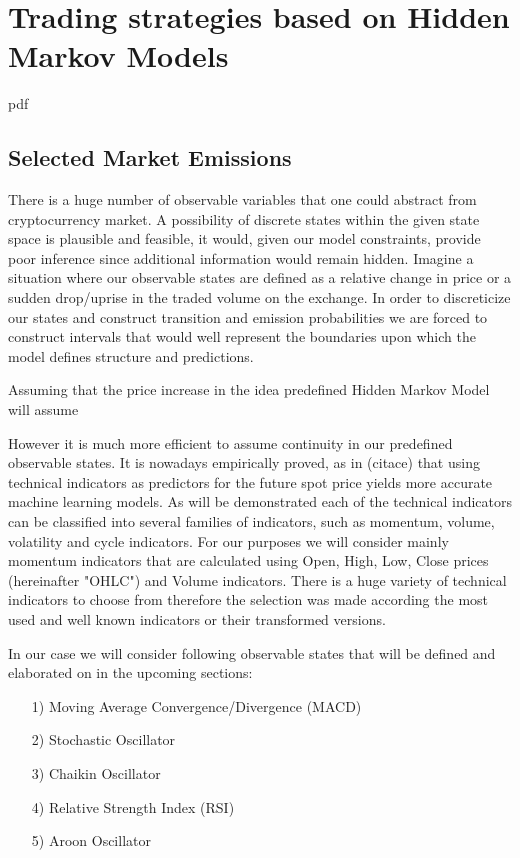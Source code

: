 \chapter{Trading strategies based on Hidden Markov Models}

\if
pdf
    \graphicspath{{Chapter5/Figs/Raster/}{Chapter5/Figs/PDF/}{Chapter5/Figs/}}
\else
    \graphicspath{{Chapter5/Figs/Vector/}{Chapter5/Figs/}}
\fi

\section{Selected Market Emissions}

	There is a huge number of observable variables that one could abstract from cryptocurrency market. A possibility of discrete states within the given state space is plausible and feasible, it would, given our model constraints, provide poor inference since additional information would remain hidden. Imagine a situation where our observable states are defined as a relative change in price or a sudden drop/uprise in the traded volume on the exchange. In order to discreticize our states and construct transition and emission probabilities we are forced to construct intervals that would well represent the boundaries upon which the model defines structure and predictions. 
	
Assuming that the price increase in   the idea predefined Hidden Markov Model will assume
	
	However it is much more efficient to assume continuity in our predefined observable states. It is nowadays empirically proved, as in (citace) that using technical indicators as predictors for the future spot price yields more accurate machine learning models. As will be demonstrated each of the technical indicators can be classified into several families of indicators, such as momentum, volume, volatility and cycle indicators. For our purposes we will consider mainly momentum indicators that are calculated using Open, High, Low, Close prices (hereinafter "OHLC") and Volume indicators. There is a huge variety of technical indicators to choose from therefore the selection was made according the most used and well known indicators or their transformed versions. 

In our case we will consider following observable states that will be defined and elaborated on in the upcoming sections:

\begin{itemize}
\item[1)] Moving Average Convergence/Divergence (MACD)
\item[2)] Stochastic Oscillator
\item[3)] Chaikin Oscillator 
\item[4)] Relative Strength Index (RSI)
\item[5)] Aroon Oscillator 
\end{itemize}


